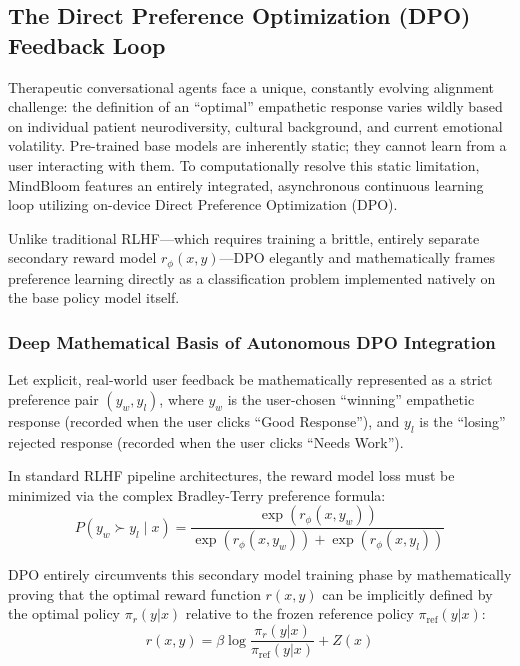 \documentclass[12pt,twoside]{article}
\begin{document}
\subsection{The Direct Preference Optimization (DPO) Feedback Loop}

Therapeutic conversational agents face a unique, constantly evolving alignment challenge: the definition of an ``optimal'' empathetic response varies wildly based on individual patient neurodiversity, cultural background, and current emotional volatility. Pre-trained base models are inherently static; they cannot learn from a user interacting with them. To computationally resolve this static limitation, MindBloom features an entirely integrated, asynchronous continuous learning loop utilizing on-device Direct Preference Optimization (DPO).

Unlike traditional RLHF---which requires training a brittle, entirely separate secondary reward model $r_\phi(x, y)$---DPO elegantly and mathematically frames preference learning directly as a classification problem implemented natively on the base policy model itself.

\subsubsection{Deep Mathematical Basis of Autonomous DPO Integration}

Let explicit, real-world user feedback be mathematically represented as a strict preference pair $(y_w, y_l)$, where $y_w$ is the user-chosen ``winning'' empathetic response (recorded when the user clicks ``Good Response''), and $y_l$ is the ``losing'' rejected response (recorded when the user clicks ``Needs Work'').

In standard RLHF pipeline architectures, the reward model loss must be minimized via the complex Bradley-Terry preference formula:
\begin{equation}
  P(y_w \succ y_l \mid x) = \frac{\exp(r_\phi(x, y_w))}{\exp(r_\phi(x, y_w)) + \exp(r_\phi(x, y_l))}
\end{equation}

DPO entirely circumvents this secondary model training phase by mathematically proving that the optimal reward function $r(x,y)$ can be implicitly defined by the optimal policy $\pi_r(y|x)$ relative to the frozen reference policy $\pi_{\text{ref}}(y|x)$:
\begin{equation}
  r(x,y) = \beta \log \frac{\pi_r(y|x)}{\pi_{\text{ref}}(y|x)} + Z(x)
\end{equation}
\end{document}
